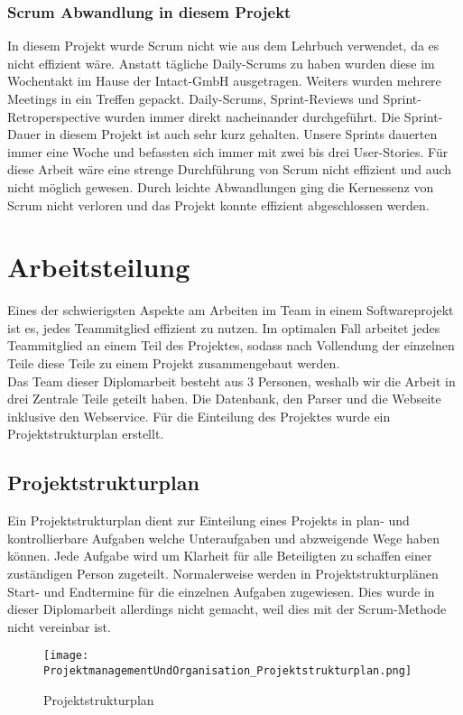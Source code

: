 \subsubsection{Scrum Abwandlung in diesem Projekt}
\label{sec:ScrumAbwandlungInDiesemProjekt}
In diesem Projekt wurde Scrum nicht wie aus dem Lehrbuch verwendet, da es nicht effizient wäre. Anstatt tägliche Daily-Scrums zu haben wurden diese im Wochentakt im Hause der Intact-GmbH ausgetragen. Weiters wurden mehrere Meetings in ein Treffen gepackt. Daily-Scrums, Sprint-Reviews und Sprint-Retroperspective wurden immer direkt nacheinander durchgeführt. Die Sprint-Dauer in diesem Projekt ist auch sehr kurz gehalten. Unsere Sprints dauerten immer eine Woche und befassten sich immer mit zwei bis drei User-Stories. Für diese Arbeit wäre eine strenge Durchführung von Scrum nicht effizient und auch nicht möglich gewesen. Durch leichte Abwandlungen ging die Kernessenz von Scrum nicht verloren und das Projekt konnte effizient abgeschlossen werden.

\section{Arbeitsteilung}
\label{ref:Arbeitsteilung}
Eines der schwierigsten Aspekte am Arbeiten im Team in einem Softwareprojekt ist es, jedes Teammitglied effizient zu nutzen. Im optimalen Fall arbeitet jedes Teammitglied an einem Teil des Projektes, sodass nach Vollendung der einzelnen Teile diese Teile zu einem Projekt zusammengebaut werden.\\
Das Team dieser Diplomarbeit besteht aus 3 Personen, weshalb wir die Arbeit in drei Zentrale Teile geteilt haben. Die Datenbank, den Parser und die Webseite inklusive den Webservice. Für die Einteilung des Projektes wurde ein Projektstrukturplan erstellt.

\subsection{Projektstrukturplan}
\label{ref:Projektstrukturplan}
Ein Projektstrukturplan dient zur Einteilung eines Projekts in plan- und kontrollierbare Aufgaben welche Unteraufgaben und abzweigende Wege haben können. Jede Aufgabe wird um Klarheit für alle Beteiligten zu schaffen einer zuständigen Person zugeteilt. Normalerweise werden in Projektstrukturplänen Start- und Endtermine für die einzelnen Aufgaben zugewiesen. Dies wurde in dieser Diplomarbeit allerdings nicht gemacht, weil dies mit der Scrum-Methode nicht vereinbar ist.
\begin{figure}[H]
	\texttt{[image: ProjektmanagementUndOrganisation\_Projektstrukturplan.png]}
    \caption{Projektstrukturplan}
    \label{fig:projektStrukturplan}
\end{figure}

